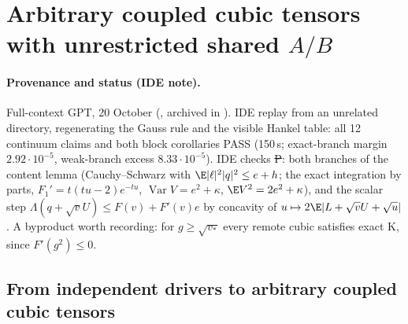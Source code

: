 \section{Arbitrary coupled cubic tensors with unrestricted shared $A/B$}\label{ch:coupled-tensor}

\paragraph{Provenance and status (IDE note).} Full-context GPT, 20 October (, archived in
). IDE replay  from an unrelated directory, regenerating the Gauss rule and the visible
Hankel table: all 12 continuum claims and both block corollaries PASS (150\,s; exact-branch margin $2.92\cdot10^{-5}$, weak-branch excess $8.33\cdot10^{-5}$).
IDE checks \st{P}: both branches of the content lemma (Cauchy--Schwarz with $\E|\ell|^2|q|^2\le e+h$; the exact integration by parts, $F_1'=t(tu-2)e^{-tu}$,
$\operatorname{Var}V=e^2+\kappa$, $\E V^2=2e^2+\kappa$), and the scalar step $\Lambda(q+\sqrt vU)\le F(v)+F'(v)e$ by concavity of $u\mapsto2\E|L+\sqrt vU+\sqrt u|$.
A byproduct worth recording: for $g\ge\sqrt{v_*}$ every remote cubic satisfies exact K, since $F'(g^2)\le0$.

\subsection{From independent drivers to arbitrary coupled cubic tensors}
\label{sec:coupled-tensor-milestone}

